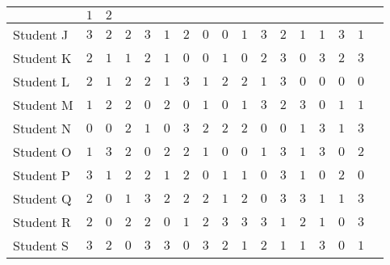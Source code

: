 \documentclass[11pt]{article}
\begin{document}
\begin{center}
\begin{table}[h]
\begin{tabular}{|a|l|l|l|l|l|l|l|l|l|l|l|l|l|c|l|l|}
& $1$ & $2$ \\ \hline
Student J & $3$ & $2$ & $2$ & $3$ & $1$ & $2$
& $0$ & $0$ & $1$ & $3$ & $2$ & $1$ & $1$
& $3$ & $1$ \\ \hline
Student K & $2$ & $1$ & $1$ & $2$ & $1$ & $0$
& $0$ & $1$ & $0$ & $2$ & $3$ & $0$ & $3$
& $2$ & $3$ \\ \hline
Student L & $2$ & $1$ & $2$ & $2$ & $1$ & $3$
& $1$ & $2$ & $2$ & $1$ & $3$ & $0$ & $0$
& $0$ & $0$ \\ \hline
Student M & $1$ & $2$ & $2$ & $0$ & $2$ & $0$
& $1$ & $0$ & $1$ & $3$ & $2$ & $3$ & $0$
& $1$ & $1$ \\ \hline
Student N & $0$ & $0$ & $2$ & $1$ & $0$ & $3$
& $2$ & $2$ & $2$ & $0$ & $0$ & $1$ & $3$ & $1$ & $3$ \\ \hline
Student O & $1$ & $3$ & $2$ & $0$ & $2$ & $2$
& $1$ & $0$ & $0$ & $1$ & $3$ & $1$ & $3$
& $0$ & $2$ \\ \hline
Student P & $3$ & $1$ & $2$ & $2$ & $1$ & $2$
& $0$ & $1$ & $1$ & $0$ & $3$ & $1$ & $0$
& $2$ & $0$ \\ \hline
Student Q & $2$ & $0$ & $1$ & $3$ & $2$ & $2$
& $2$ & $1$ & $2$ & $0$ & $3$ & $3$ & $1$
& $1$ & $3$ \\ \hline
Student R & $2$ & $0$ & $2$ & $2$ & $0$ & $1$
& $2$ & $3$ & $3$ & $3$ & $1$ & $2$ & $1$
& $0$ & $3$ \\ \hline
Student S & $3$ & $2$ & $0$ & $3$ & $3$ & $0$
& $3$ & $2$ & $1$ & $2$ & $1$ & $1$ & $3$
& $0$ & $1$ \\ \hline

\end{tabular}
\end{table}
\end{center}
\end{document}
